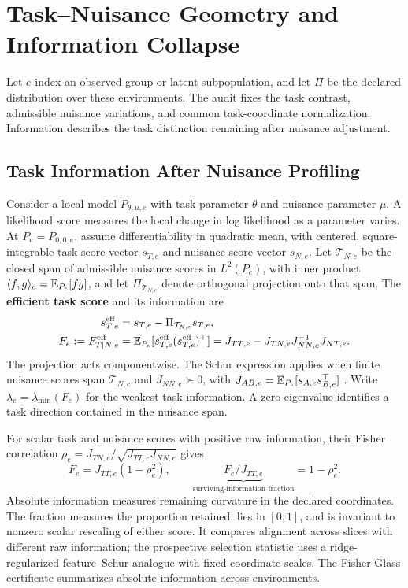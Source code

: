 \section{Task--Nuisance Geometry and Information Collapse}
\label{sec:geometry}

Let $e$ index an observed group or latent subpopulation, and let $\Pi$ be the declared distribution over these environments. The audit fixes the task contrast, admissible nuisance variations, and common task-coordinate normalization. Information describes the task distinction remaining after nuisance adjustment.

\subsection{Task Information After Nuisance Profiling}
\label{sec:task-information}

Consider a local model $P_{\theta,\mu,e}$ with task parameter $\theta$ and nuisance parameter $\mu$. A likelihood score measures the local change in log likelihood as a parameter varies. At $P_e=P_{0,0,e}$, assume differentiability in quadratic mean, with centered, square-integrable task-score vector $s_{T,e}$ and nuisance-score vector $s_{N,e}$. Let $\mathcal T_{N,e}$ be the closed span of admissible nuisance scores in $L^2(P_e)$, with inner product $\langle f,g\rangle_e=\mathbb{E}_{P_e}[fg]$, and let $\Pi_{\mathcal T_{N,e}}$ denote orthogonal projection onto that span. The \textbf{efficient task score} and its information are
\begin{equation}
\begin{aligned}
s^{\mathrm{eff}}_{T,e}&=s_{T,e}-\Pi_{\mathcal T_{N,e}}s_{T,e},\\
F_e:=F^{\mathrm{eff}}_{T\mid N,e}
&=\mathbb{E}_{P_e}[s^{\mathrm{eff}}_{T,e}(s^{\mathrm{eff}}_{T,e})^\top]
=J_{TT,e}-J_{TN,e}J_{NN,e}^{-1}J_{NT,e}.
\end{aligned}
\label{eq:efficient-score-information}
\end{equation}
The projection acts componentwise. The Schur expression applies when finite nuisance scores span $\mathcal T_{N,e}$ and $J_{NN,e}\succ0$, with $J_{AB,e}=\mathbb{E}_{P_e}[s_{A,e}s_{B,e}^{\top}]$ \citep{bickel1993efficient,tsiatis2006semiparametric,cox1987parameter}. Write $\lambda_e=\lambda_{\min}(F_e)$ for the weakest task information. A zero eigenvalue identifies a task direction contained in the nuisance span.

For scalar task and nuisance scores with positive raw information, their Fisher correlation $\rho_e=J_{TN,e}/\sqrt{J_{TT,e}J_{NN,e}}$ gives
\begin{equation}
F_e=J_{TT,e}(1-\rho_e^2),
\qquad
\underbrace{F_e/J_{TT,e}}_{\text{surviving-information fraction}}=1-\rho_e^2.
\label{eq:surviving-information-fraction}
\end{equation}
Absolute information measures remaining curvature in the declared coordinates. The fraction measures the proportion retained, lies in $[0,1]$, and is invariant to nonzero scalar rescaling of either score. It compares alignment across slices with different raw information; the prospective selection statistic uses a ridge-regularized feature--Schur analogue with fixed coordinate scales. The Fisher-Glass certificate summarizes absolute information across environments.


